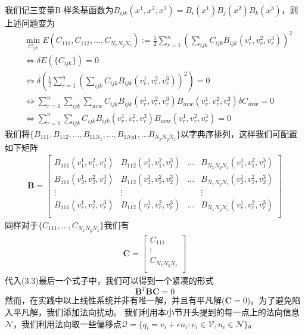 我们记三变量B-样条基函数为$B_{ijk}(x^1,x^2,x^3) = B_i(x^1)B_j(x^2)B_k(x^3)$，则上述问题变为
\begin{equation}
    \begin{split}
        &\min_{C_{ijk}}E(C_{111},C_{112},...,C_{N_xN_yN_z}):= \frac{1}{2}\sum_{r = 1}^{n} (\sum_{ijk}C_{ijk}B_{ijk}(v_r^1,v_r^2,v_r^3))^2 \\
        &\Leftrightarrow \delta E(\{C_{ijk}\}) = 0\\
        &\Leftrightarrow \delta (\frac{1}{2}\sum_{r = 1}^{n} (\sum_{ijk}C_{ijk}B_{ijk}(v_r^1,v_r^2,v_r^3))^2) = 0\\
        &\Leftrightarrow \sum_{r = 1}^{n} \sum_{ijk} \sum_{uvw}C_{ijk}B_{ijk}(v_r^1,v_r^2,v_r^3)B_{uvw}(v_r^1,v_r^2,v_r^3)\delta C_{uvw} = 0\\
        &\Leftrightarrow \sum_{r = 1}^n \sum_{ijk} C_{ijk} B_{ijk}(v_r^1,v_r^2,v_r^3)B_{uvw}(v_r^1,v_r^2,v_r^3) = 0
    \end{split}
\end{equation}
我们将$\{B_{111},B_{112},...,B_{11N_z},...,B_{1Ny1},...B_{N_xN_yN_z}\}$以字典序排列，这样我们可配置如下矩阵
\begin{align*}
    \mathbf{B} = \begin{bmatrix}
        B_{111}(v_1^1,v_1^2,v_1^3) & B_{112}(v_1^1,v_1^2,v_1^3) &...& B_{N_xN_yN_z}(v_1^1,v_1^2,v_1^3)\\
        B_{111}(v_2^1,v_2^2,v_2^3) & B_{112}(v_2^1,v_2^2,v_2^3) &...& B_{N_xN_yN_z}(v_2^1,v_2^2,v_2^3)\\
         \vdots & \vdots & & \vdots\\
        B_{111}(v_r^1,v_r^2,v_r^3) & B_{112}(v_r^1,v_r^2,v_r^3) &...& B_{N_xN_yN_z}(v_r^1,v_r^2,v_r^3)\\
    \end{bmatrix}
\end{align*}
同样对于$\{C_{111},...,C_{N_xN_yN_z}\}$我们有
\begin{align*}
    \mathbf{C} = \begin{bmatrix}
        C_{111} \\
        \vdots \\
        C_{N_xN_yN_z}\\
    \end{bmatrix}
\end{align*}
代入(3.3)最后一个式子中，我们可以得到一个紧凑的形式
$$\mathbf{B}^T \mathbf{B} \mathbf{C} = 0$$
然而，在实践中以上线性系统并非有唯一解，并且有平凡解($\mathbf{C} = 0$)。为了避免陷入平凡解，我们添加法向扰动。
我们利用本小节开头提到的每一点上的法向信息$\mathcal{N}$，我们利用法向取一些偏移点$\mathcal{Q} = \{q_i = v_i + \epsilon n_i: v_i \in \mathcal{V}, n_i \in \mathcal{N}\}$。
